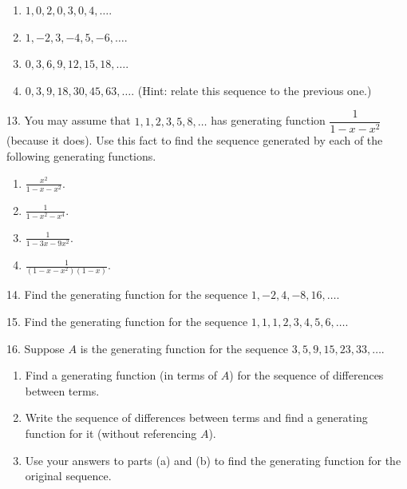 \documentclass[10pt,]{book}
\theoremstyle{plain}
\theoremstyle{definition}
\theoremstyle{definition}
\theoremstyle{definition}
\numberwithin{equation}{chapter}
\begin{document}
\begin{exerciselist}
%
\leavevmode%
\begin{enumerate}[label=(\alph*)]
\item\hypertarget{li-1348}{}\(1, 0, 2, 0, 3, 0, 4,\ldots\).%
\item\hypertarget{li-1349}{}\(1, -2, 3, -4, 5, -6, \ldots\).%
\item\hypertarget{li-1350}{}\(0, 3, 6, 9, 12, 15, 18, \ldots\).%
\item\hypertarget{li-1351}{}\(0, 3, 9, 18, 30, 45, 63,\ldots\). (Hint: relate this sequence to the previous one.)%
\end{enumerate}
\par\smallskip
\item[13.]\hypertarget{exercise-334}{}
You may assume that \(1, 1, 2, 3, 5, 8,\ldots\) has generating function \(\dfrac{1}{1-x-x^2}\) (because it does). Use this fact to find the sequence generated by each of the following generating functions.
%
\leavevmode%
\begin{enumerate}[label=(\alph*)]
\item\hypertarget{li-1356}{}\(\frac{x^2}{1-x-x^2}\).%
\item\hypertarget{li-1357}{}\(\frac{1}{1-x^2-x^4}\).%
\item\hypertarget{li-1358}{}\(\frac{1}{1-3x-9x^2}\).%
\item\hypertarget{li-1359}{}\(\frac{1}{(1-x-x^2)(1-x)}\).%
\end{enumerate}
\par\smallskip
\item[14.]\hypertarget{exercise-335}{}
Find the generating function for the sequence \(1, -2, 4, -8, 16, \ldots\).
%
\par\smallskip
\item[15.]\hypertarget{exercise-336}{}
Find the generating function for the sequence \(1, 1, 1, 2, 3, 4, 5, 6, \ldots\).
%
\par\smallskip
\item[16.]\hypertarget{exercise-337}{}
Suppose \(A\) is the generating function for the sequence \(3, 5, 9, 15, 23, 33, \ldots\).
%
\leavevmode%
\begin{enumerate}[label=(\alph*)]
\item\hypertarget{li-1364}{}
Find a generating function (in terms of \(A\)) for the sequence of differences between terms.
%
\item\hypertarget{li-1365}{}
Write the sequence of differences between terms and find a generating function for it (without referencing \(A\)).
%
\item\hypertarget{li-1366}{}
Use your answers to parts (a) and (b) to find the generating function for the original sequence.
%
\end{enumerate}
\par\smallskip
\end{exerciselist}
\typeout{************************************************}
\typeout{************************************************}
\end{document}
